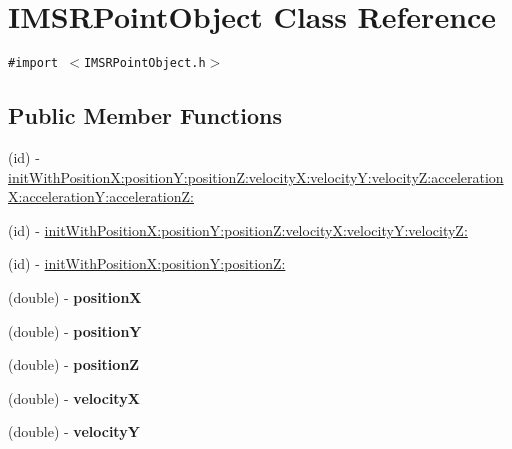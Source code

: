 \hypertarget{interface_i_m_s_r_point_object}{
\section{IMSRPointObject Class Reference}
\label{interface_i_m_s_r_point_object}
}
{\tt \#import $<$IMSRPointObject.h$>$}

\subsection*{Public Member Functions}
\begin{CompactItemize}
\item 
(id) - \hyperlink{interface_i_m_s_r_point_object_0251ecd091ae3e8a0840a6b6ab35be0b}{initWithPositionX:positionY:positionZ:velocityX:velocityY:velocityZ:accelerationX:accelerationY:accelerationZ:}
\item 
(id) - \hyperlink{interface_i_m_s_r_point_object_4ed4386983dba714a6678023ac353199}{initWithPositionX:positionY:positionZ:velocityX:velocityY:velocityZ:}
\item 
(id) - \hyperlink{interface_i_m_s_r_point_object_603d5f56f6b9344693f108efa3786d79}{initWithPositionX:positionY:positionZ:}
\item 
\hypertarget{interface_i_m_s_r_point_object_ddb88a4b481defa5b3b7729df3bb57f8}{
(double) - \textbf{positionX}}
\label{interface_i_m_s_r_point_object_ddb88a4b481defa5b3b7729df3bb57f8}

\item 
\hypertarget{interface_i_m_s_r_point_object_f637e44f6254cc47cfbf81d56f15994c}{
(double) - \textbf{positionY}}
\label{interface_i_m_s_r_point_object_f637e44f6254cc47cfbf81d56f15994c}

\item 
\hypertarget{interface_i_m_s_r_point_object_59f94c17273b79b4dd5eecfaa51481c1}{
(double) - \textbf{positionZ}}
\label{interface_i_m_s_r_point_object_59f94c17273b79b4dd5eecfaa51481c1}

\item 
\hypertarget{interface_i_m_s_r_point_object_5beac3d3291e9ff6ceb148379685ce0e}{
(double) - \textbf{velocityX}}
\label{interface_i_m_s_r_point_object_5beac3d3291e9ff6ceb148379685ce0e}

\item 
\hypertarget{interface_i_m_s_r_point_object_f3dda01ad689f9c38ab77584434cc1ed}{
(double) - \textbf{velocityY}}
\label{interface_i_m_s_r_point_object_f3dda01ad689f9c38ab77584434cc1ed}


\end{CompactItemize}
